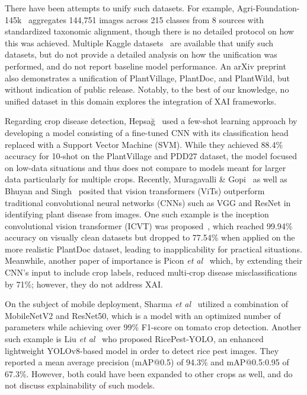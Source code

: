 \documentclass{bmvc2k}
\def\etal{\emph{et al}\bmvaOneDot}
\begin{document}
There have been attempts to unify such datasets. For example, Agri-Foundation-145k~\cite{agri_foundation_145k_2026} aggregates 144,751 images across 215 classes from 8 sources with standardized taxonomic alignment, though there is no detailed protocol on how this was achieved. Multiple Kaggle datasets~\cite{sikder2025combined, popik2026plantlab} are available that unify such datasets, but do not provide a detailed analysis on how the unification was performed, and do not report baseline model performance. An arXiv preprint~\cite{kumar2025mobile} also demonstrates a unification of PlantVillage, PlantDoc, and PlantWild, but without indication of public release. Notably, to the best of our knowledge, no unified dataset in this domain explores the integration of XAI frameworks. 

Regarding crop disease detection, Hepsağ~\cite{hepsag2023} used a few-shot learning approach by developing a model consisting of a fine-tuned CNN with its classification head replaced with a Support Vector Machine (SVM). While they achieved 88.4\% accuracy for 10-shot on the PlantVillage and PDD27 dataset, the model focused on low-data situations and thus does not compare to models meant for larger data particularly for multiple crops. Recently, Muragavalli \& Gopi~\cite{murugavalli2025plant} as well as Bhuyan and Singh~\cite{bhuyan2024evaluating} posited that vision transformers (ViTs) outperform traditional convolutional neural networks (CNNs) such as VGG and ResNet in identifying plant disease from images. One such example is the inception convolutional vision transformer (ICVT) was proposed~\cite{yu2023icvt}, which reached 99.94\% accuracy on visually clean datasets but dropped to 77.54\% when applied on the more realistic PlantDoc dataset, leading to inapplicability for practical situations. Meanwhile, another paper of importance is Picon \etal~\cite{picon2019conditional} which, by extending their CNN's input to include crop labels, reduced multi-crop disease misclassifications by 71\%; however, they do not address XAI.

On the subject of mobile deployment, Sharma \etal~\cite{sharma2025} utilized a combination of MobileNetV2 and ResNet50, which is a model with an optimized number of parameters while achieving over 99\% F1-score on tomato crop detection. Another such example is Liu \etal~\cite{liu2025} who proposed RicePest-YOLO, an enhanced lightweight YOLOv8-based model in order to detect rice pest images. They reported a mean average precision (mAP@0.5) of 94.3\% and mAP@0.5:0.95 of 67.3\%. However, both could have been expanded to other crops as well, and do not discuss explainability of such models.
\end{document}
